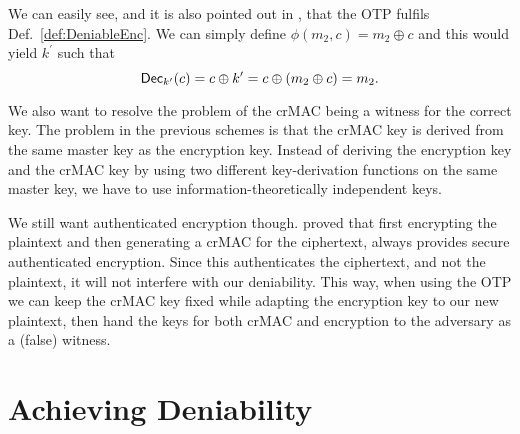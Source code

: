 We can easily see, and it is also pointed out in \cite{deniablecrypt}, that the 
\ac{OTP} fulfils Def.~\ref{def:DeniableEnc}.
We can simply define \(\phi( m_2, c ) = m_2\oplus c\) and this would yield 
\(k^\prime\) such that \[
  \operatorname{\mathsf{Dec}}_{k^\prime}( c ) = c\oplus k^\prime = c\oplus ( m_2\oplus c ) = m_2.
\]


We also want to resolve the problem of the \ac{crMAC} being a witness for the 
correct key.
The problem in the previous schemes is that the \ac{crMAC} key is derived from 
the same master key as the encryption key.
Instead of deriving the encryption key and the \ac{crMAC} key by using two 
different key-derivation functions on the same master key, we have to use 
information-theoretically independent keys.

We still want authenticated encryption though.
\citet{authenc} proved that first encrypting the plaintext and then generating 
a \ac{crMAC} for the ciphertext, always provides secure authenticated 
encryption.
Since this authenticates the ciphertext, and not the plaintext, it will not 
interfere with our deniability.
This way, when using the \ac{OTP} we can keep the \ac{crMAC} key fixed while 
adapting the encryption key to our new plaintext, then hand the keys for both 
\ac{crMAC} and encryption to the adversary as a (false) witness.


\section{Achieving Deniability}
\label{sec:otp-kx}


